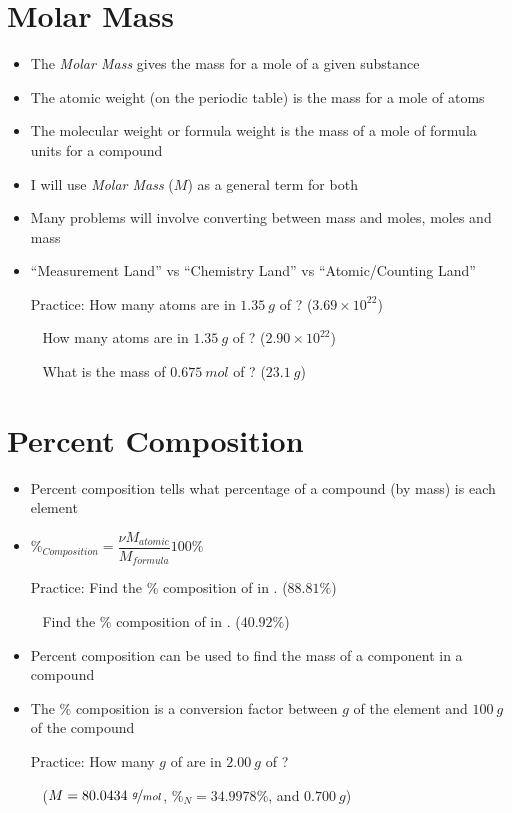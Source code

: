 \documentclass[12pt, openany, letterpaper]{memoir}
\begin{document}
\section{Molar Mass}
\begin{itemize}
	\item The \emph{Molar Mass} gives the mass for a mole of a given substance
	\item The atomic weight (on the periodic table) is the mass for a mole of atoms
	\item The molecular weight or formula weight is the mass of a mole of formula units for a compound
	\item I will use \emph{Molar Mass} ($M$) as a general term for both
	\item Many problems will involve converting between mass and moles, moles and mass
	\item ``Measurement Land'' vs ``Chemistry Land'' vs ``Atomic/Counting Land''
	
	Practice: How many  atoms are in $1.35~g$ of ? ($3.69\times10^{22}$)
	
	~\hphantom{Practice:} How many  atoms are in $1.35~g$ of ? ($2.90\times10^{22}$)
	
	~\hphantom{Practice:} What is the mass of $0.675~mol$ of ? ($23.1~g$)
\end{itemize}
\section{Percent Composition}
\begin{itemize}
	\item Percent composition tells what percentage of a compound (by mass) is each element
	\item $\%_{Composition}=\dfrac{\nu M_{atomic}}{M_{formula}}100\%$
	
	Practice: Find the \% composition of  in . ($88.81\%$)
	
	~\hphantom{Practice:} Find the \% composition of  in . ($40.92\%$)	
	\item Percent composition can be used to find the mass of a component in a compound
	\item The \% composition is a conversion factor between $g$ of the element and $100~g$ of the compound
	
	Practice: How many $g$ of  are in $2.00~g$ of ?
	
	~\hphantom{Practice:} ($M=80.0434~\nicefrac{g}{mol}$, $\%_N=34.9978\%$, and $0.700~g$)
\end{itemize}
\end{document}
